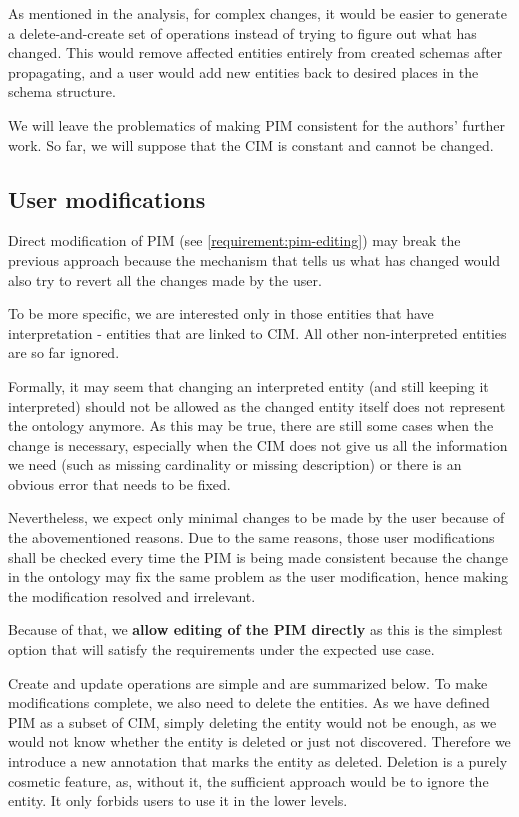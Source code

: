 As mentioned in the analysis, for complex changes, it would be easier to generate a delete-and-create set of operations instead of trying to figure out what has changed. This would remove affected entities entirely from created schemas after propagating, and a user would add new entities back to desired places in the schema structure.

\medskip

We will leave the problematics of making PIM consistent for the authors' further work. So far, we will suppose that the CIM is constant and cannot be changed.

\subsection{User modifications}\label{section:pim-user-modifications}

Direct modification of PIM (see \autoref{requirement:pim-editing}) may break the previous approach because the mechanism that tells us what has changed would also try to revert all the changes made by the user.

To be more specific, we are interested only in those entities that have interpretation - entities that are linked to CIM. All other non-interpreted entities are so far ignored.

Formally, it may seem that changing an interpreted entity (and still keeping it interpreted) should not be allowed as the changed entity itself does not represent the ontology anymore. As this may be true, there are still some cases when the change is necessary, especially when the CIM does not give us all the information we need (such as missing cardinality or missing description) or there is an obvious error that needs to be fixed.

\medskip

Nevertheless, we expect only minimal changes to be made by the user because of the abovementioned reasons. Due to the same reasons, those user modifications shall be checked every time the PIM is being made consistent because the change in the ontology may fix the same problem as the user modification, hence making the modification resolved and irrelevant.

Because of that, we \textbf{allow editing of the PIM directly} as this is the simplest option that will satisfy the requirements under the expected use case.

Create and update operations are simple and are summarized below. To make modifications complete, we also need to delete the entities. As we have defined PIM as a subset of CIM, simply deleting the entity would not be enough, as we would not know whether the entity is deleted or just not discovered. Therefore we introduce a new annotation that marks the entity as deleted. Deletion is a purely cosmetic feature, as, without it, the sufficient approach would be to ignore the entity. It only forbids users to use it in the lower levels.

